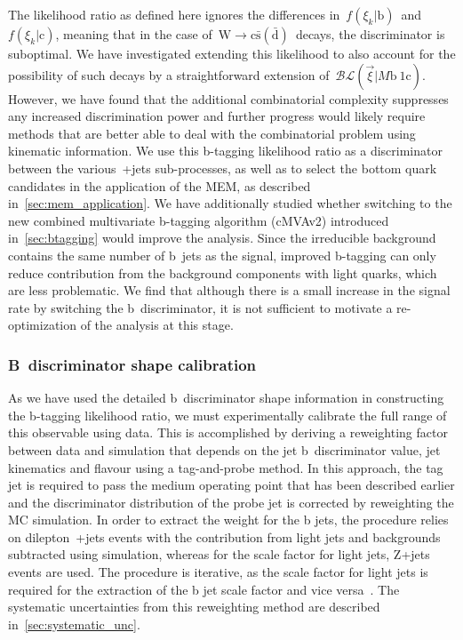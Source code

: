 The likelihood ratio as defined here ignores the differences in~$f(\xi_k | \mathrm{b})$~and~$f(\xi_k | \mathrm{c})$, meaning that in the case of~$\mathrm{W} \rightarrow \mathrm{c}\bar{\mathrm{s}} (\bar{\mathrm{d}})$~decays, the discriminator is suboptimal. We have investigated extending this likelihood to also account for the possibility of such decays by a straightforward extension of~$\mathcal{BL}(\vec{\xi} | M\mathrm{b}~1\mathrm{c})$. However, we have found that the additional combinatorial complexity suppresses any increased discrimination power and further progress would likely require methods that are better able to deal with the combinatorial problem using kinematic information. We use this b-tagging likelihood ratio as a discriminator between the various~\ttbar+jets sub-processes, as well as to select the bottom quark candidates in the application of the MEM, as described in~\cref{sec:mem_application}. We have additionally studied whether switching to the new combined multivariate b-tagging algorithm (cMVAv2) introduced in~\cref{sec:btagging} would improve the analysis. Since the irreducible \ttbb\xspace background contains the same number of b~jets as the \ttHbb\xspace signal, improved b-tagging can only reduce contribution from the background components with light quarks, which are less problematic. We find that although there is a small increase in the signal rate by switching the b~discriminator, it is not sufficient to motivate a re-optimization of the analysis at this stage. 

\subsubsection{B~discriminator shape calibration}
As we have used the detailed b~discriminator shape information in constructing the b-tagging likelihood ratio, we must experimentally calibrate the full range of this observable using data. This is accomplished by deriving a reweighting factor between data and simulation that depends on the jet b~discriminator value, jet kinematics and flavour using a tag-and-probe method. In this approach, the tag jet is required to pass the medium operating point that has been described earlier and the discriminator distribution of the probe jet is corrected by reweighting the MC simulation. In order to extract the weight for the b jets, the procedure relies on dilepton~\ttbar+jets events with the contribution from light jets and backgrounds subtracted using simulation, whereas for the scale factor for light jets, Z+jets events are used. The procedure is iterative, as the scale factor for light jets is required for the extraction of the b jet scale factor and vice versa~\cite{CMS:2013sea,CMS-PAS-BTV-15-001}. The systematic uncertainties from this reweighting method are described in~\cref{sec:systematic_unc}.

